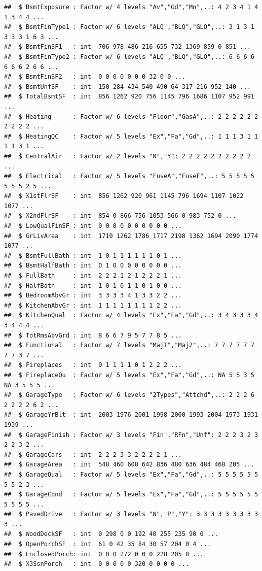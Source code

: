 \documentclass[
]{article}
\begin{document}
\begin{verbatim}
##  $ BsmtExposure : Factor w/ 4 levels "Av","Gd","Mn",..: 4 2 3 4 1 4 1 3 4 4 ...
##  $ BsmtFinType1 : Factor w/ 6 levels "ALQ","BLQ","GLQ",..: 3 1 3 1 3 3 3 1 6 3 ...
##  $ BsmtFinSF1   : int  706 978 486 216 655 732 1369 859 0 851 ...
##  $ BsmtFinType2 : Factor w/ 6 levels "ALQ","BLQ","GLQ",..: 6 6 6 6 6 6 6 2 6 6 ...
##  $ BsmtFinSF2   : int  0 0 0 0 0 0 0 32 0 0 ...
##  $ BsmtUnfSF    : int  150 284 434 540 490 64 317 216 952 140 ...
##  $ TotalBsmtSF  : int  856 1262 920 756 1145 796 1686 1107 952 991 ...
##  $ Heating      : Factor w/ 6 levels "Floor","GasA",..: 2 2 2 2 2 2 2 2 2 2 ...
##  $ HeatingQC    : Factor w/ 5 levels "Ex","Fa","Gd",..: 1 1 1 3 1 1 1 1 3 1 ...
##  $ CentralAir   : Factor w/ 2 levels "N","Y": 2 2 2 2 2 2 2 2 2 2 ...
##  $ Electrical   : Factor w/ 5 levels "FuseA","FuseF",..: 5 5 5 5 5 5 5 5 2 5 ...
##  $ X1stFlrSF    : int  856 1262 920 961 1145 796 1694 1107 1022 1077 ...
##  $ X2ndFlrSF    : int  854 0 866 756 1053 566 0 983 752 0 ...
##  $ LowQualFinSF : int  0 0 0 0 0 0 0 0 0 0 ...
##  $ GrLivArea    : int  1710 1262 1786 1717 2198 1362 1694 2090 1774 1077 ...
##  $ BsmtFullBath : int  1 0 1 1 1 1 1 1 0 1 ...
##  $ BsmtHalfBath : int  0 1 0 0 0 0 0 0 0 0 ...
##  $ FullBath     : int  2 2 2 1 2 1 2 2 2 1 ...
##  $ HalfBath     : int  1 0 1 0 1 1 0 1 0 0 ...
##  $ BedroomAbvGr : int  3 3 3 3 4 1 3 3 2 2 ...
##  $ KitchenAbvGr : int  1 1 1 1 1 1 1 1 2 2 ...
##  $ KitchenQual  : Factor w/ 4 levels "Ex","Fa","Gd",..: 3 4 3 3 3 4 3 4 4 4 ...
##  $ TotRmsAbvGrd : int  8 6 6 7 9 5 7 7 8 5 ...
##  $ Functional   : Factor w/ 7 levels "Maj1","Maj2",..: 7 7 7 7 7 7 7 7 3 7 ...
##  $ Fireplaces   : int  0 1 1 1 1 0 1 2 2 2 ...
##  $ FireplaceQu  : Factor w/ 5 levels "Ex","Fa","Gd",..: NA 5 5 3 5 NA 3 5 5 5 ...
##  $ GarageType   : Factor w/ 6 levels "2Types","Attchd",..: 2 2 2 6 2 2 2 2 6 2 ...
##  $ GarageYrBlt  : int  2003 1976 2001 1998 2000 1993 2004 1973 1931 1939 ...
##  $ GarageFinish : Factor w/ 3 levels "Fin","RFn","Unf": 2 2 2 3 2 3 2 2 3 2 ...
##  $ GarageCars   : int  2 2 2 3 3 2 2 2 2 1 ...
##  $ GarageArea   : int  548 460 608 642 836 480 636 484 468 205 ...
##  $ GarageQual   : Factor w/ 5 levels "Ex","Fa","Gd",..: 5 5 5 5 5 5 5 5 2 3 ...
##  $ GarageCond   : Factor w/ 5 levels "Ex","Fa","Gd",..: 5 5 5 5 5 5 5 5 5 5 ...
##  $ PavedDrive   : Factor w/ 3 levels "N","P","Y": 3 3 3 3 3 3 3 3 3 3 ...
##  $ WoodDeckSF   : int  0 298 0 0 192 40 255 235 90 0 ...
##  $ OpenPorchSF  : int  61 0 42 35 84 30 57 204 0 4 ...
##  $ EnclosedPorch: int  0 0 0 272 0 0 0 228 205 0 ...
##  $ X3SsnPorch   : int  0 0 0 0 0 320 0 0 0 0 ...

\end{verbatim}
\end{document}
